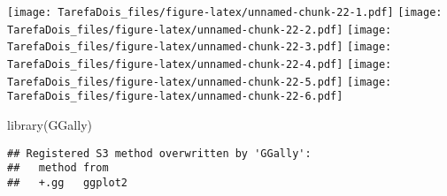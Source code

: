 \documentclass[
]{article}
\newenvironment{Shaded}{\begin{snugshade}}{\end{snugshade}}
\newcommand{\AttributeTok}[1]{\textcolor[rgb]{0.77,0.63,0.00}{#1}}
\newcommand{\ControlFlowTok}[1]{\textcolor[rgb]{0.13,0.29,0.53}{\textbf{#1}}}
\newcommand{\DecValTok}[1]{\textcolor[rgb]{0.00,0.00,0.81}{#1}}
\newcommand{\FloatTok}[1]{\textcolor[rgb]{0.00,0.00,0.81}{#1}}
\newcommand{\FunctionTok}[1]{\textcolor[rgb]{0.00,0.00,0.00}{#1}}
\newcommand{\NormalTok}[1]{#1}
\newcommand{\OtherTok}[1]{\textcolor[rgb]{0.56,0.35,0.01}{#1}}
\newcommand{\SpecialCharTok}[1]{\textcolor[rgb]{0.00,0.00,0.00}{#1}}
\newcommand{\StringTok}[1]{\textcolor[rgb]{0.31,0.60,0.02}{#1}}
\begin{document}
\begin{Shaded}
\end{Shaded}

\texttt{[image: TarefaDois\_files/figure-latex/unnamed-chunk-22-1.pdf]}
\texttt{[image: TarefaDois\_files/figure-latex/unnamed-chunk-22-2.pdf]}
\texttt{[image: TarefaDois\_files/figure-latex/unnamed-chunk-22-3.pdf]}
\texttt{[image: TarefaDois\_files/figure-latex/unnamed-chunk-22-4.pdf]}
\texttt{[image: TarefaDois\_files/figure-latex/unnamed-chunk-22-5.pdf]}
\texttt{[image: TarefaDois\_files/figure-latex/unnamed-chunk-22-6.pdf]}

\begin{Shaded}
\begin{Highlighting}[]
\FunctionTok{library}\NormalTok{(GGally)}
\end{Highlighting}
\end{Shaded}

\begin{verbatim}
## Registered S3 method overwritten by 'GGally':
##   method from   
##   +.gg   ggplot2
\end{verbatim}

\begin{Shaded}
\end{Shaded}
\end{document}
